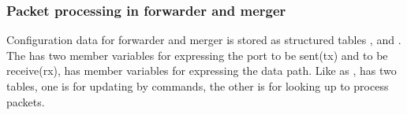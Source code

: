 \documentclass[a4paper,11pt,openany,oneside,english]{sphinxmanual}
\begin{document}
\begin{sphinxVerbatim}[commandchars=\\\{\},formatcom=\footnotesize]

   
     


   
\end{sphinxVerbatim}


\subsubsection{Packet processing in forwarder and merger}
\label{\detokenize{design/impl/spp_vf:packet-processing-in-forwarder-and-merger}}
Configuration data for forwarder and merger is stored as structured
tables ,  and .
The  has two member variables for expressing the port
to be sent(tx) and to be receive(rx),
 has member variables for expressing the data path.
Like as ,  has two tables,
one is for updating by commands, the other is for looking up to process
packets.
\end{document}

